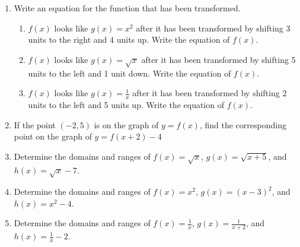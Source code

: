 \begin{enumerate}
\item Write an equation for the function that has been transformed.
\begin{enumerate}
\item $f(x)$ looks like $g(x)=x^2$ after it has been transformed by shifting 3 units to the right and 4 units up.  Write the equation of $f(x)$.
\vfill
\item $f(x)$ looks like $g(x)=\sqrt{x}$ after it has been transformed by shifting 5 units to the left and 1 unit down.  Write the equation of $f(x)$.
\vfill
\item $f(x)$ looks like $\displaystyle g(x)=\frac{1}{x}$ after it has been transformed by shifting 2 units to the left and 5 units up.  Write the equation of $f(x)$.
\vfill
\end{enumerate}

\item If the point $(-2,5)$ is on the graph of $y=f(x)$, find the corresponding point on the graph of $y=f(x+2)-4$
\vfill

\newpage
\item Determine the domains and ranges of $f(x)=\sqrt{x}$, $g(x)=\sqrt{x+5}$, and $h(x)=\sqrt{x}-7$.
\vfill

\item Determine the domains and ranges of $f(x)=x^2$, $g(x)=(x-3)^2$, and $h(x)=x^2-4$.
\vfill

\item Determine the domains and ranges of $\displaystyle f(x)=\frac{1}{x}$, $\displaystyle g(x)=\frac{1}{x+2}$, and $\displaystyle h(x)=\frac{1}{x}-2$.
\vfill

\end{enumerate}

